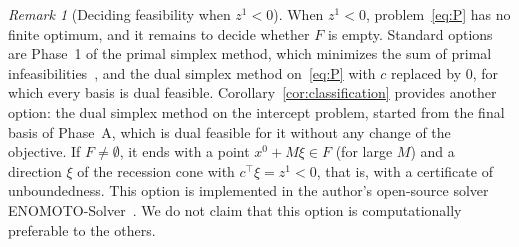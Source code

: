 \documentclass[11pt,a4paper]{article}
\theoremstyle{plain}
\theoremstyle{definition}
\theoremstyle{remark}
\newtheorem{remark}[theorem]{Remark}
\begin{document}
\begin{remark}[Deciding feasibility when $z^1<0$]
\label{rem:feasibility}
When $z^1<0$, problem~\eqref{eq:P} has no finite optimum, and it remains to decide whether $F$ is empty. Standard options are Phase~1 of the primal simplex method, which minimizes the sum of primal infeasibilities~\cite{chvatal1983,bertsimas1997}, and the dual simplex method on~\eqref{eq:P} with $c$ replaced by $0$, for which every basis is dual feasible. Corollary~\ref{cor:classification} provides another option: the dual simplex method on the intercept problem, started from the final basis of Phase~A, which is dual feasible for it without any change of the objective. If $F\neq\emptyset$, it ends with a point $x^0+M\xi\in F$ (for large $M$) and a direction $\xi$ of the recession cone with $c^\top\xi=z^1<0$, that is, with a certificate of unboundedness. This option is implemented in the author's open-source solver ENOMOTO-Solver~\cite{enomotosolver}. We do not claim that this option is computationally preferable to the others.
\end{remark}
\end{document}
